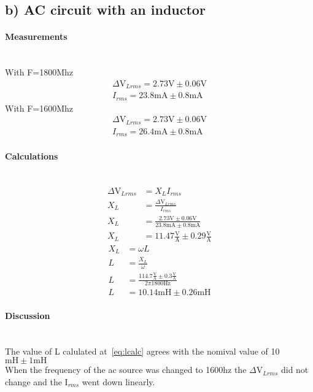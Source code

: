 \documentclass{report}
\begin{document}
\subsection*{b) AC circuit with an inductor}
\paragraph{Measurements}\mbox{}\\
With F=1800Mhz
\begin{gather}
    \Delta\si{\volt}_{Lrms}=2.73\si{\volt}\pm0.06\si{\volt}\\ 
    I_{rms}=23.8\si{\milli\ampere}\pm0.8\si{\milli\ampere}
\end{gather}
With F=1600Mhz
\begin{gather}
    \Delta\si{\volt}_{Lrms}=2.73\si{\volt}\pm0.06\si{\volt}\\ 
    I_{rms}=26.4\si{\milli\ampere}\pm0.8\si{\milli\ampere}
\end{gather}
\paragraph{Calculations}\mbox{}\\
\begin{align}
    \Delta\si{\volt}_{Lrms}&=X_{L}I_{rms}\nonumber\\
    X_{L}&=\frac{\Delta\si{\volt}_{Lrms}}{I_{rms}}\nonumber\\
    X_{L}&=\frac{2.73\si{\volt}\pm0.06\si{\volt}}{23.8\si{\milli\ampere}\pm0.8\si{\milli\ampere}}\nonumber\\
    X_{L}&=11.47\frac{\si{\volt}}{\si{\ampere}} \pm 0.29 \frac{\si{\volt}}{\si{\ampere}} \label{eq:xlcalc}
\end{align}
\begin{align}
    X_{L}&=\omega L\nonumber\\
    L&=\frac{X_{L}}{\omega}\nonumber\\
    L&=\frac{114.7\frac{\si{\volt}}{\si{\ampere}} \pm 0.3 \frac{\si{\volt}}{\si{\ampere}}}{2\pi1800\si{\hertz}} \nonumber\\
    L&=10.14\si{\milli}\si{\henry} \pm 0.26\si{\milli}\si{\henry}\label{eq:lcalc}
\end{align}
\paragraph{Discussion}\mbox{}\\
The value of L calulated at~\eqref{eq:lcalc} agrees with the nomival value of 10$\si{\milli}\si{\henry}\pm1\si{\milli}\si{\henry}$\\
When the frequency of the ac source was changed to 1600hz the $\Delta\si{\volt}_{Lrms}$ did not change and the I$_{rms}$ went down linearly.
\newpage
\end{document}
